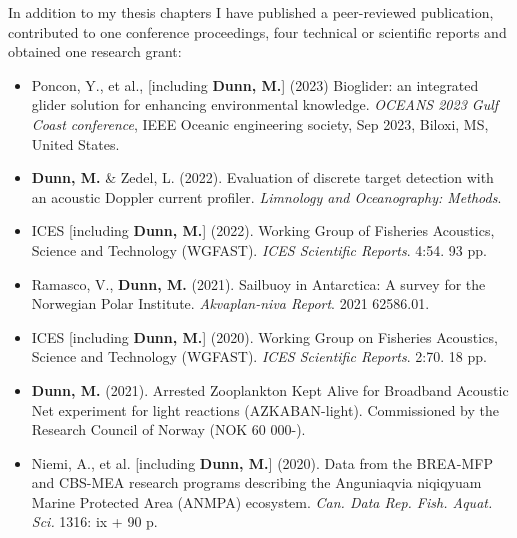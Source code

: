 In addition to my thesis chapters I have published a peer-reviewed publication, contributed to one conference proceedings, four technical or scientific reports and obtained one research grant:
\begin{itemize}
\item Poncon, Y., et al., [including \textbf{Dunn, M.}] (2023) Bioglider: an integrated glider solution for enhancing environmental knowledge. \textit{OCEANS 2023 Gulf Coast conference}, IEEE Oceanic engineering society, Sep 2023, Biloxi, MS, United States.
\item \textbf{Dunn, M.} \& Zedel, L. (2022). Evaluation of discrete target detection with an acoustic Doppler current profiler. \textit{Limnology and Oceanography: Methods}.
\item ICES [including \textbf{Dunn, M.}] (2022). Working Group of Fisheries Acoustics, Science and Technology (WGFAST).\textit{ ICES Scientific Reports}. 4:54. 93 pp.
\item Ramasco, V., \textbf{Dunn, M.} (2021). Sailbuoy in Antarctica: A survey for the Norwegian Polar Institute. \textit{Akvaplan-niva Report}. 2021 62586.01.
\item ICES [including \textbf{Dunn, M.}] (2020). Working Group on Fisheries Acoustics, Science and Technology (WGFAST). \textit{ICES Scientific Reports}. 2:70. 18 pp.
\item \textbf{Dunn, M.} (2021). Arrested Zooplankton Kept Alive for Broadband Acoustic Net experiment for light reactions (AZKABAN-light). Commissioned by the Research Council of Norway (NOK 60 000-).
\item Niemi, A., et al. [including \textbf{Dunn, M.}] (2020). Data from the BREA-MFP and CBS-MEA research programs describing the Anguniaqvia niqiqyuam Marine Protected Area (ANMPA) ecosystem. \textit{Can. Data Rep. Fish. Aquat. Sci.} 1316: ix + 90 p.
\end{itemize}


